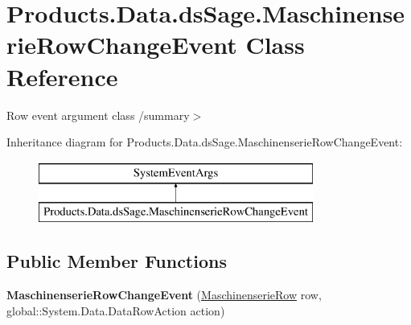 \hypertarget{class_products_1_1_data_1_1ds_sage_1_1_maschinenserie_row_change_event}{}\section{Products.\+Data.\+ds\+Sage.\+Maschinenserie\+Row\+Change\+Event Class Reference}
\label{class_products_1_1_data_1_1ds_sage_1_1_maschinenserie_row_change_event}


Row event argument class /summary$>$  


Inheritance diagram for Products.\+Data.\+ds\+Sage.\+Maschinenserie\+Row\+Change\+Event\+:\begin{figure}[H]
\begin{center}
\leavevmode
\includegraphics[height=2.000000cm]{class_products_1_1_data_1_1ds_sage_1_1_maschinenserie_row_change_event}
\end{center}
\end{figure}
\subsection*{Public Member Functions}
\begin{DoxyCompactItemize}
\item 
{\bfseries Maschinenserie\+Row\+Change\+Event} (\hyperlink{class_products_1_1_data_1_1ds_sage_1_1_maschinenserie_row}{Maschinenserie\+Row} row, global\+::\+System.\+Data.\+Data\+Row\+Action action)\hypertarget{class_products_1_1_data_1_1ds_sage_1_1_maschinenserie_row_change_event_a553714fe1b89a7aa04734db0b426c972}{}\label{class_products_1_1_data_1_1ds_sage_1_1_maschinenserie_row_change_event_a553714fe1b89a7aa04734db0b426c972}

\end{DoxyCompactItemize}
